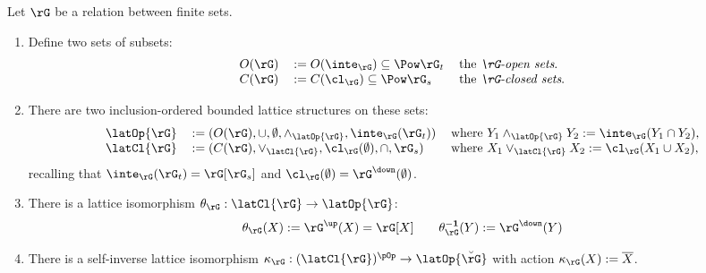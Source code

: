\documentclass{article}
\begin{document}
\begin{definition}
\label{def:bip_cl_inte_lattice}
\item
Let $\rG$ be a relation between finite sets.
\begin{enumerate}
\item
Define two sets of subsets:
\[
\begin{tabular}{lll}
$O(\rG)$ & $:= O(\inte_\rG) \subseteq \Pow \rG_t$
& the \emph{$\rG$-open sets}.
\\
$C(\rG)$ & $:= C(\cl_\rG) \subseteq \Pow \rG_s$
& the \emph{$\rG$-closed sets}.
\end{tabular}
\]

\item
There are two inclusion-ordered bounded lattice structures on these sets:
\[
\begin{tabular}{lll}
$\latOp{\rG}$ 
& 
$:= (O(\rG),\cup,\emptyset,\land_{\latOp{\rG}},\inte_\rG(\rG_t))$
&
where $Y_1 \land_{\latOp{\rG}} Y_2 := \inte_\rG(Y_1 \cap Y_2)$,
\\
$\latCl{\rG}$
&
$:= (C(\rG),\lor_{\latCl{\rG}},\cl_\rG(\emptyset),\cap,\rG_s)$
&
  where $X_1 \lor_{\latCl{\rG}} X_2 := \cl_\rG(X_1 \cup X_2)$,
  \end{tabular}
  \]
  recalling that $\inte_\rG(\rG_t) = \rG[\rG_s]$ and $\cl_\rG(\emptyset) = \rG^\down(\emptyset)$.
  
\item
There is a lattice isomorphism $\theta_\rG : \latCl{\rG} \to \latOp{\rG}$:
  \[
  \theta_\rG(X) := \rG^\up(X) = \rG[X]
  \qquad
  \theta_\rG^{\bf-1}(Y) := \rG^\down(Y)
  \]
\item
There is a self-inverse lattice isomorphism $\kappa_\rG : (\latCl{\rG})^{\pOp} \to \latOp{\breve{\rG}}$ with action $\kappa_\rG(X) := \overline{X}$.
\endbox
\end{enumerate}
\end{definition}

\bigskip
\end{document}
